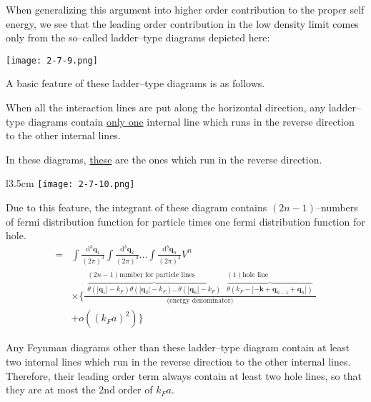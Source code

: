 When generalizing this argument into higher order contribution to the proper self energy, we see that the leading order contribution in the low density limit comes only from the so--called ladder--type diagrams depicted here:

\begin{center}
\texttt{[image: 2-7-9.png]}\label{Fig2.7.9}
\begin{equation} \label{Eqs2.7.3}\end{equation}
\end{center}

A basic feature of these ladder--type diagrams is as follows.

When all the interaction lines are put along the horizontal direction, any ladder--type diagrams contain \underline{only one} internal line which runs in the reverse direction to the other internal lines.

In these diagrams, \underline{these} are the ones which run in the reverse direction.

\begin{wrapfigure}[6]{l}{3.5cm}
\label{Fig2.7.10} \texttt{[image: 2-7-10.png]}
\end{wrapfigure}
Due to this feature, the integrant of these diagram contains $(2n-1)$--numbers of fermi distribution function for particle times one fermi distribution function for hole.
\[ \begin{split}
= &\int \frac{\mathrm{d}^3 \mathbf{q}_1}{(2\pi)^3} \int \frac{\mathrm{d}^3 \mathbf{q}_2}{(2\pi)^3} \ldots \int \frac{\mathrm{d}^3 \mathbf{q}_n}{(2\pi)^3} V^n \\
& \times \{  \frac{
\begin{matrix} (2n-1)\text{number for particle lines} \\ \overbrace{ \theta(|\mathbf{q}_1|-k_F)\theta(|\mathbf{q}_2|-k_F)\ldots\theta(|\mathbf{q}_n|-k_F) } \end{matrix}
\begin{matrix} (1) \text{hole line} \\ \overbrace{ \theta(k_F-|-\mathbf{k}+\mathbf{q}_{n-1}+\mathbf{q}_n|)} \end{matrix}}{\text{(energy denominator)}}\\
& + o((k_F a)^2) \}
\end{split} \]

Any Feynman diagrams other than these ladder--type diagram contain at least two internal lines which run in the reverse direction to the other internal lines. Therefore, their leading order term always contain at least two hole lines, so that they are at most the 2nd order of $k_F a$.

